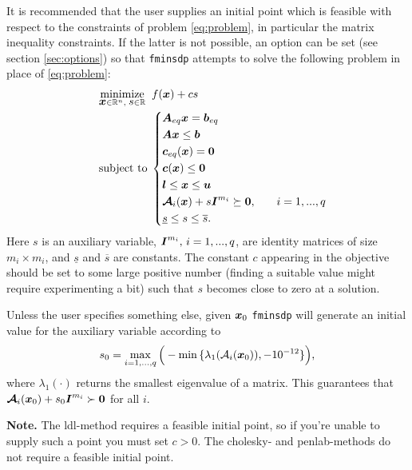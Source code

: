 \documentclass{article}
\newcommand{\bm}[1]{\mbox{\boldmath $#1$}}
\begin{document}
It is recommended that the user supplies an initial point which is feasible with respect to the constraints of problem \eqref{eq:problem}, in particular the matrix inequality constraints. If the latter is not possible, an option can be set (see section \ref{sec:options}) so that \texttt{fminsdp} attempts to solve the following problem in place of \eqref{eq:problem}:
\begin{equation}\label{eq:problem3}
\quad
	\begin{aligned}
	&	\underset{\bm{x}\in\mathbb{R}^{n},\; \mbox{$s$}\in\mathbb{R}}{\mbox{minimize}} \;\; f(\bm{x}) + cs \\
	&	\mbox{subject to} \;
	\left\{
		\begin{aligned}
			& \bm{A}_{eq}\bm{x} = \bm{b}_{eq} &\\
			& \bm{A}\bm{x} \leq \bm{b}	      &\\
			& \bm{c}_{eq}(\bm{x}) = \bm{0}	 	&\\
		  & \bm{c}(\bm{x}) \leq \bm{0}			&\\
			& \bm{l} \leq \bm{x} \leq \bm{u}	&\\
			& \bm{\mathcal{A}}_{i}(\bm{x}) + s\bm{I}^{m_{i}} \succeq \bm{0}, & \quad i = 1,...,q \\
			& \underline{s} \leq s \leq \overline{s}. & 
		\end{aligned}
		\right.
	\end{aligned}
\end{equation}
Here $s$ is an auxiliary variable, $\bm{I}^{m_{i}},\, i = 1,...,q$, are identity matrices of size $m_{i} \times m_{i}$, and
$\underline{s}$ and $\overline{s}$ are constants. The constant $c$ appearing in the objective should be set to some large positive number (finding a suitable value might require experimenting a bit) such that $s$ becomes close to zero at a solution. 

Unless the user specifies something else, given $\bm{x}_{0}$ \texttt{fminsdp} will generate an initial value for the auxiliary variable according to
\begin{equation}\nonumber
s_{0} = \max_{i=1,\ldots,q}\Big(-\min \,\{\lambda_{1}(\mathcal{A}_{i}(\bm{x}_{0})),-10^{-12}\}\Big),
\end{equation}
where $\lambda_{1}(\cdot)$ returns the smallest eigenvalue of a matrix. This guarantees that $\bm{\mathcal{A}}_{i}(\bm{x}_{0}) + s_{0}\bm{I}^{m_{i}} \succ \bm{0}$ for all $i$.

\vskip 2mm
\noindent \textbf{Note.} The ldl-method requires a feasible initial point, so if you're unable to supply such a point you must set $c > 0$. The cholesky- and penlab-methods do not require a feasible initial point.
\end{document}
